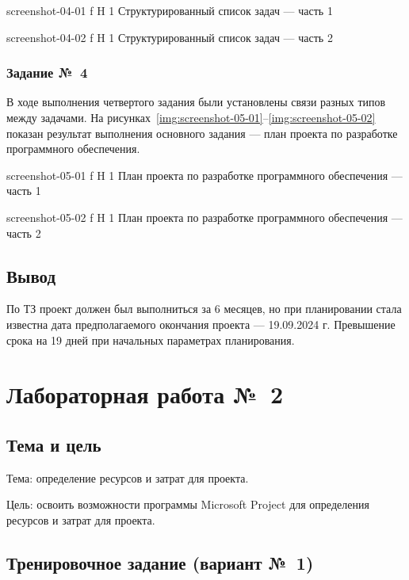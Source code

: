 \documentclass{bmstu}
\begin{document}
    {screenshot-04-01}
    {f}
    {H}
    {1\textwidth}
    {Структурированный список задач --- часть 1}
    
    {screenshot-04-02}
    {f}
    {H}
    {1\textwidth}
    {Структурированный список задач --- часть 2}

\subsection{Задание №~4}

В ходе выполнения четвертого задания были установлены связи разных типов между задачами. 
На рисунках~\ref{img:screenshot-05-01}--\ref{img:screenshot-05-02} показан результат выполнения основного задания --- план проекта по разработке программного обеспечения.
    
    {screenshot-05-01}
    {f}
    {H}
    {1\textwidth}
    {План проекта по разработке программного обеспечения --- часть 1}
    
    {screenshot-05-02}
    {f}
    {H}
    {1\textwidth}
    {План проекта по разработке программного обеспечения --- часть 2}
    
\section{Вывод}

По ТЗ проект должен был выполниться за 6 месяцев, но при планировании стала известна дата предполагаемого окончания проекта --- 19.09.2024 г. 
Превышение срока на 19 дней при начальных параметрах планирования.

\chapter{Лабораторная работа №~2}

\section{Тема и цель}

Тема: определение ресурсов и затрат для проекта.

Цель: освоить возможности программы Microsoft Project для определения ресурсов и затрат для проекта.

\section{Тренировочное задание (вариант №~1)}
\end{document}
